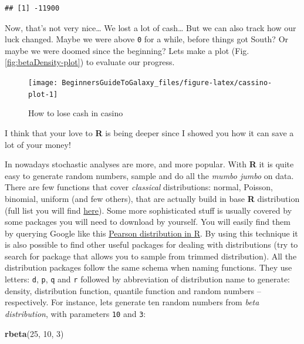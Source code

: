 \documentclass[]{book}
\newenvironment{Shaded}{\begin{snugshade}}{\end{snugshade}}
\newcommand{\KeywordTok}[1]{\textcolor[rgb]{0.13,0.29,0.53}{\textbf{#1}}}
\newcommand{\DecValTok}[1]{\textcolor[rgb]{0.00,0.00,0.81}{#1}}
\newcommand{\NormalTok}[1]{#1}
\theoremstyle{definition}
\theoremstyle{definition}
\theoremstyle{definition}
\theoremstyle{remark}
\begin{document}
\begin{verbatim}
## [1] -11900
\end{verbatim}

Now, that's not very nice\ldots{} We lost a lot of cash\ldots{} But we
can also track how our luck changed. Maybe we were above \texttt{0} for
a while, before things got South? Or maybe we were doomed since the
beginning? Lets make a plot (Fig. \ref{fig:betaDensity-plot}) to
evaluate our progress.

\begin{figure}

{\centering \texttt{[image: BeginnersGuideToGalaxy\_files/figure-latex/cassino-plot-1]} 

}

\caption{How to lose cash in casino}\label{fig:cassino-plot}
\end{figure}

I think that your love to \textbf{R} is being deeper since I showed you
how it can save a lot of your money!

In nowadays stochastic analyses are more, and more popular. With
\textbf{R} it is quite easy to generate random numbers, sample and do
all the \emph{mumbo jumbo} on data. There are few functions that cover
\emph{classical} distributions: normal, Poisson, binomial, uniform (and
few others), that are actually build in base \textbf{R} distribution
(full list you will find
\href{https://stat.ethz.ch/R-manual/R-devel/library/stats/html/Distributions.html}{here}).
Some more sophisticated stuff is usually covered by some packages you
will need to download by yourself. You will easily find them by querying
Google like this
\href{https://www.google.com/search?client=ubuntu\&channel=fs\&q=Pearson+distribution+in+R\&ie=utf-8\&oe=utf-8\&gfe_rd=cr\&dcr=0\&ei=KTI5Ws_7LfPBXrSBr7gO}{Pearson
distribution in R}. By using this technique it is also possible to find
other useful packages for dealing with distributions (try to search for
package that allows you to sample from trimmed distribution). All the
distribution packages follow the same schema when naming functions. They
use letters: \texttt{d}, \texttt{p}, \texttt{q} and \texttt{r} followed
by abbreviation of distribution name to generate: density, distribution
function, quantile function and random numbers -- respectively. For
instance, lets generate ten random numbers from \emph{beta
distribution}, with parameters \texttt{10} and \texttt{3}:

\begin{Shaded}
\begin{Highlighting}[]
\KeywordTok{rbeta}\NormalTok{(}\DecValTok{25}\NormalTok{, }\DecValTok{10}\NormalTok{, }\DecValTok{3}\NormalTok{)}
\end{Highlighting}
\end{Shaded}
\end{document}
